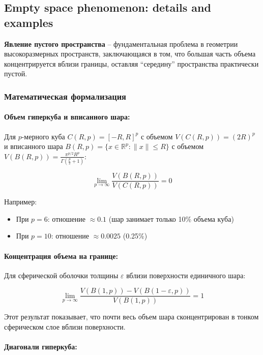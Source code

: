 \documentclass[a4paper,12pt]{article}
\begin{document}
\subsection{Empty space phenomenon: details and examples}

\textbf{Явление пустого пространства} -- фундаментальная проблема в геометрии высокоразмерных пространств, заключающаяся в том, что большая часть объема концентрируется вблизи границы, оставляя ``середину'' пространства практически пустой.

\subsubsection{Математическая формализация}

\paragraph{Объем гиперкуба и вписанного шара:}
   
Для $p$-мерного куба $C(R, p) = [-R, R]^p$ с объемом $V(C(R, p)) = (2R)^p$ и вписанного шара $B(R, p) = \{x \in \mathbb{R}^p: \|x\| \leq R\}$ с объемом $V(B(R, p)) = \frac{\pi^{p/2}R^p}{\Gamma(\frac{p}{2}+1)}$:
   
$$\lim_{p \to \infty} \frac{V(B(R, p))}{V(C(R, p))} = 0$$
   
Например:
\begin{itemize}
    \item При $p = 6$: отношение $\approx 0.1$ (шар занимает только 10\% объема куба)
    \item При $p = 10$: отношение $\approx 0.0025$ (0.25\%)
\end{itemize}

\paragraph{Концентрация объема на границе:}
   
Для сферической оболочки толщины $\varepsilon$ вблизи поверхности единичного шара:
   
$$\lim_{p \to \infty} \frac{V(B(1, p)) - V(B(1-\varepsilon, p))}{V(B(1, p))} = 1$$
   
Этот результат показывает, что почти весь объем шара сконцентрирован в тонком сферическом слое вблизи поверхности.

\paragraph{Диагонали гиперкуба:}
   
\end{document}
